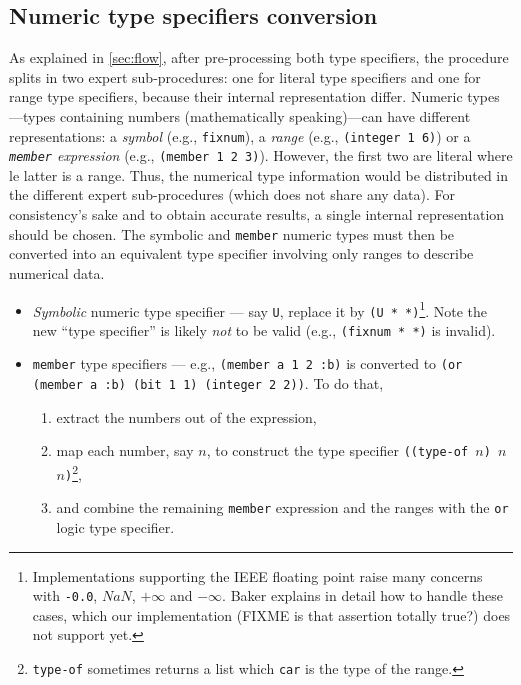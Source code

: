 \documentclass[format=sigconf]{acmart}
\newcommand\code[2][\small]{\sloppy\texttt{#1#2}}
\newcommand\footcode[1]{\code[\scriptsize]{#1}}
\theoremstyle{definition}
\begin{document}
\subsection{Numeric type specifiers conversion}
\label{sec:numconv}
As explained in \vref{sec:flow}, after pre-processing both type specifiers, the
procedure splits in two expert sub-procedures: one for literal type specifiers
and one for range type specifiers, because their internal representation differ.
Numeric types---types containing numbers (mathematically speaking)---can have
different representations: a \emph{symbol} (e.g., \code{fixnum}), a \emph{range}
(e.g., \code{(integer 1 6)}) or a \emph{\code{member} expression}
(e.g., \code{(member 1 2 3)}). However, the first two are literal where le
latter is a range. Thus, the numerical type information would be distributed in
the different expert sub-procedures (which does not share any data). For
consistency's sake and to obtain accurate results, a single internal
representation should be chosen. The symbolic and \code{member} numeric types
must then be converted into an equivalent type specifier involving only ranges
to describe numerical data.

\begin{itemize}
\item \emph{Symbolic} numeric type specifier --- say \code{U}, replace it by
  \code{(U * *)}\footnote{Implementations supporting the IEEE floating point
    raise many concerns with \footcode{-0.0}, $NaN$, $+\infty$ and $-\infty$.
    Baker explains in detail how to handle these cases, which our implementation
    (FIXME is that assertion totally true?)
    does not support yet.}. Note the new ``type specifier'' is likely
  \emph{not} to be valid (e.g., \code{(fixnum * *)} is invalid).
\item \code{member} type specifiers --- e.g., \code{(member a 1 2 :b)} is
  converted to \code{(or (member a :b) (bit 1 1) (integer 2 2))}.
  To do that,
  \begin{enumerate}
  \item extract the numbers out of the expression,
  \item map each number, say $n$, to construct the type specifier
    \code{((type-of $n$) $n$ $n$)}\footnote{\footcode{type-of} sometimes
      returns a list which \footcode{car} is the type of the range.},
  \item and combine the remaining \code{member} expression and the ranges with
    the \code{or} logic type specifier.
  \end{enumerate}
\end{itemize}
\end{document}

